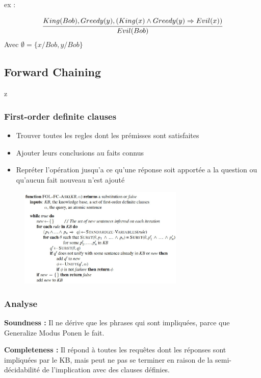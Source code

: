 \documentclass[12pt]{article}
\begin{document}
			ex :
			
			\begin{equation}
			\cfrac{King(Bob), Greedy(y), (King(x) \land Greedy(y) \Rightarrow Evil(x))}{Evil(Bob)}
			\end{equation}
			Avec $\emptyset = \{x/Bob, y/Bob\}$	
			
	\subsection{Forward Chaining}z
		\subsubsection{First-order definite clauses}

		\begin{itemize}
			\item Trouver toutes les regles dont les prémisses sont satisfaites
			\item Ajouter leurs conclusions au faits connus
			\item Repréter l'opération jusqu'a ce qu'une réponse soit apportée a la question  ou qu'aucun fait nouveau n'est ajouté
			
		\end{itemize}	
		
		\begin{figure}[htp]	
			\centering
			\includegraphics[width=0.7\textwidth]{img/ForwardChaining.png}
		\end{figure}		
		
		\subsubsection{Analyse}
			\textbf{Soundness :} Il ne dérive que les phrases qui sont impliquées, parce que Generalize Modus Ponen le fait.
			
			\textbf{Completeness :} Il répond à toutes les requêtes dont les réponses sont impliquées par le KB, mais peut ne pas se terminer en raison de la semi-décidabilité de l'implication avec des clauses définies.
			
\end{document}
